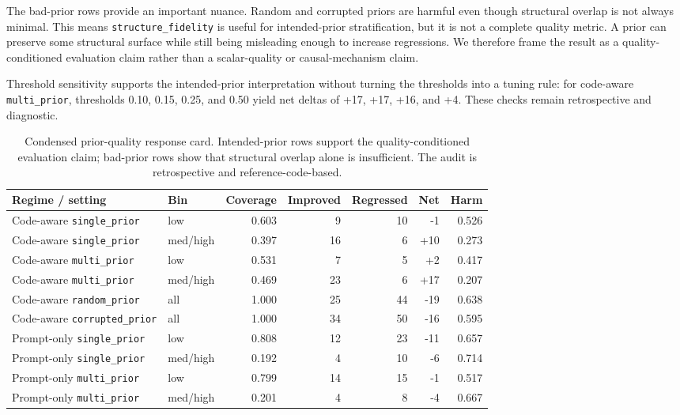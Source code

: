 \documentclass{article}
\newcommand{\code}[1]{\texttt{#1}}
\begin{document}
The bad-prior rows provide an important nuance. Random and corrupted priors are harmful even though structural overlap is not always minimal. This means \code{structure\_fidelity} is useful for intended-prior stratification, but it is not a complete quality metric. A prior can preserve some structural surface while still being misleading enough to increase regressions. We therefore frame the result as a quality-conditioned evaluation claim rather than a scalar-quality or causal-mechanism claim.

Threshold sensitivity supports the intended-prior interpretation without turning the thresholds into a tuning rule: for code-aware \code{multi\_prior}, thresholds 0.10, 0.15, 0.25, and 0.50 yield net deltas of +17, +17, +16, and +4. These checks remain retrospective and diagnostic.

\begin{table}[H]
\caption{Condensed prior-quality response card. Intended-prior rows support the quality-conditioned evaluation claim; bad-prior rows show that structural overlap alone is insufficient. The audit is retrospective and reference-code-based.}
\label{tab:quality-response}
\centering
\scriptsize
\begin{tabular}{llrrrrr}
\toprule
Regime / setting & Bin & Coverage & Improved & Regressed & Net & Harm \\
\midrule
Code-aware \code{single\_prior} & low & 0.603 & 9 & 10 & -1 & 0.526 \\
Code-aware \code{single\_prior} & med/high & 0.397 & 16 & 6 & +10 & 0.273 \\
Code-aware \code{multi\_prior} & low & 0.531 & 7 & 5 & +2 & 0.417 \\
Code-aware \code{multi\_prior} & med/high & 0.469 & 23 & 6 & +17 & 0.207 \\
Code-aware \code{random\_prior} & all & 1.000 & 25 & 44 & -19 & 0.638 \\
Code-aware \code{corrupted\_prior} & all & 1.000 & 34 & 50 & -16 & 0.595 \\
Prompt-only \code{single\_prior} & low & 0.808 & 12 & 23 & -11 & 0.657 \\
Prompt-only \code{single\_prior} & med/high & 0.192 & 4 & 10 & -6 & 0.714 \\
Prompt-only \code{multi\_prior} & low & 0.799 & 14 & 15 & -1 & 0.517 \\
Prompt-only \code{multi\_prior} & med/high & 0.201 & 4 & 8 & -4 & 0.667 \\
\bottomrule
\end{tabular}
\end{table}
\end{document}
